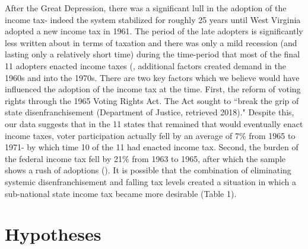 \documentclass[letter, 12pt]{article}
\begin{document}
After the Great Depression, there was a significant lull in the adoption of the income tax- indeed the system stabilized for roughly 25 years until West Virginia adopted a new income tax in 1961. The period of the late adopters is significantly less written about in terms of taxation and there was only a mild recession (and lasting only a relatively short time) during the time-period that most of the final 11 adopters enacted income taxes (\citealt{kurz1997business}, additional factors created demand in the 1960s and into the 1970s. There are two key factors which we believe would have influenced the adoption of the income tax at the time. First, the reform of voting rights through the 1965 Voting Rights Act. The Act sought to “break the grip of state disenfranchisement (Department of Justice, retrieved 2018)." Despite this, our data suggests that in the 11 states that remained that would eventually enact income taxes, voter participation actually fell by an average of 7\% from 1965 to 1971- by which time 10 of the 11 had enacted income tax. Second, the burden of the federal income tax fell by 21\% from 1963 to 1965, after which the sample shows a rush of adoptions (\citealt{irs2017}). It is possible that the combination of eliminating systemic disenfranchisement and falling tax levels created a situation in which a sub-national state income tax became more desirable (Table 1).


\section{Hypotheses}
\end{document}
